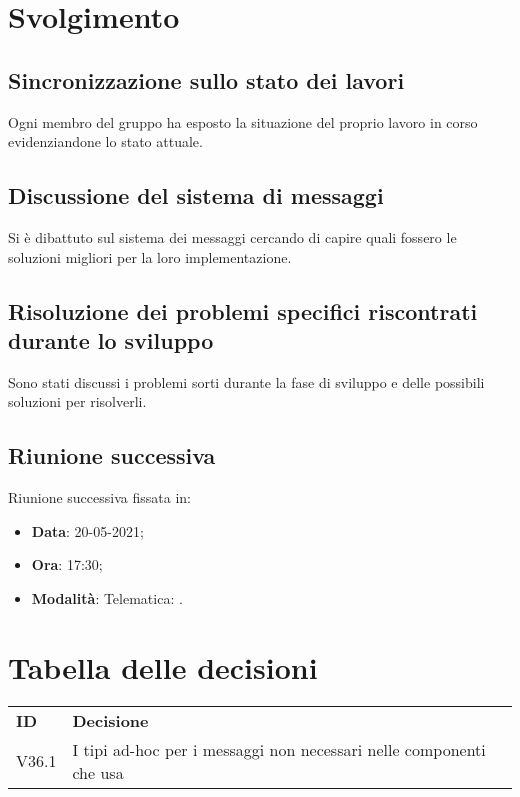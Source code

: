 \documentclass[]{article}
\begin{document}
	\newpage

	\section{Svolgimento}
		\subsection{Sincronizzazione sullo stato dei lavori}
		Ogni membro del gruppo ha esposto la situazione del proprio lavoro in corso evidenziandone lo stato attuale.\\
		
		\subsection{Discussione del sistema di messaggi}
		Si è dibattuto sul sistema dei messaggi  cercando di capire quali fossero le soluzioni migliori per la loro implementazione.
		
		\subsection{Risoluzione dei problemi specifici riscontrati durante lo sviluppo}
		Sono stati discussi i problemi sorti durante la fase di sviluppo e delle possibili soluzioni per risolverli.\\
		
		\subsection{Riunione successiva}
		Riunione successiva fissata in:
		\begin{itemize}
			\item \textbf{Data}: 20-05-2021;
			\item \textbf{Ora}: 17:30;
			\item \textbf{Modalità}: Telematica: .
		\end{itemize}
	
	
\section{Tabella delle decisioni}

\begin{table} [h!]
	\begin{center}
		\begin{tabular} { m{2cm} m{14cm} }
			\rowcolor{lightgray}
			\textbf{ID} & \textbf{Decisione}\\
			V36.1 & I tipi ad-hoc per i messaggi non necessari nelle componenti che usa \glock{Typescript} \\
		\end{tabular}
	\end{center}
\end{table}
\end{document}
